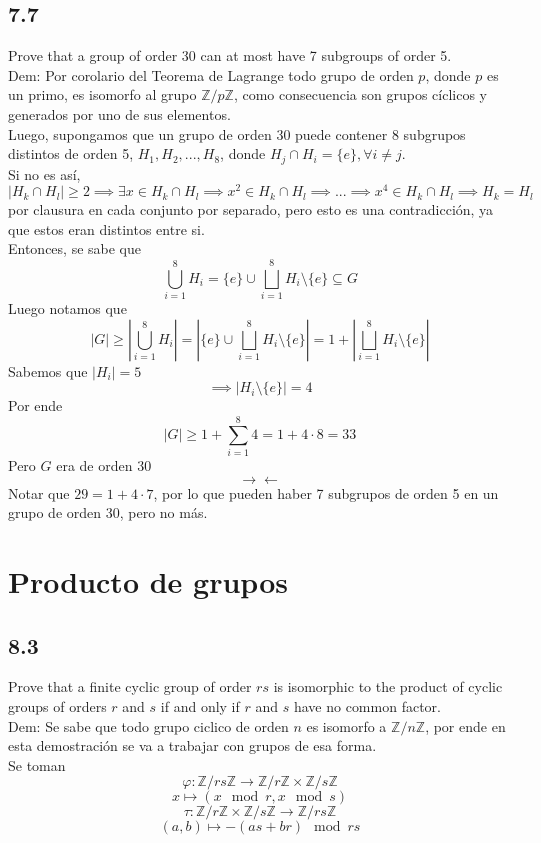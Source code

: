 \documentclass[11pt]{article}
\begin{document}
\subsection*{7.7}
Prove that a group of order 30 can at most have 7 subgroups of order 5.\\
Dem: Por corolario del Teorema de Lagrange todo grupo de orden $p$, donde $p$ es un primo, es isomorfo al grupo $\mathbb{Z}/p\mathbb{Z}$, como consecuencia son grupos cíclicos y generados por uno de sus elementos.\\
Luego, supongamos que un grupo de orden 30 puede contener 8 subgrupos distintos de orden 5, $H_1,H_2,...,H_8$, donde $H_j\cap H_i=\{e\},\forall i\neq j$.\\
Si no es así, $|H_k\cap H_l|\geq 2\implies \exists x\in H_k\cap H_l\implies x^2\in H_k\cap H_l\implies...\implies x^4\in H_k\cap H_l\implies H_k=H_l$ por clausura en cada conjunto por separado, pero esto es una contradicción, ya que estos eran distintos entre si.\\
Entonces, se sabe que
\[
\bigcup^8_{i=1}H_i=\{e\}\cup\bigsqcup^8_{i=1}H_i\setminus\{e\}\subseteq G
\]
Luego notamos que
\[
|G|\geq |\bigcup^8_{i=1}H_i|=|\{e\}\cup\bigsqcup^8_{i=1}H_i\setminus\{e\}|=1+|\bigsqcup^8_{i=1}H_i\setminus\{e\}|
\]
Sabemos que $|H_i|=5$
\[
\implies |H_i\setminus\{e\}|=4
\]
Por ende
\[
|G|\geq 1+\sum^8_{i=1}4=1+4\cdot 8=33
\]
Pero $G$ era de orden 30 
\[
\rightarrow\leftarrow
\]
Notar que $29=1+4\cdot 7$, por lo que pueden haber 7 subgrupos de orden 5 en un grupo de orden 30, pero no más.
\section{Producto de grupos}
\subsection*{8.3}
Prove that a finite cyclic group of order $rs$ is isomorphic to the product of cyclic groups of orders $r$ and $s$ if and only if $r$ and $s$ have no common factor.\\
Dem: Se sabe que todo grupo ciclico de orden $n$ es isomorfo a $\mathbb{Z}/n\mathbb{Z}$, por ende en esta demostración se va a trabajar con grupos de esa forma.\\
Se toman 
\[\varphi:\mathbb{Z}/rs\mathbb{Z}\rightarrow \mathbb{Z}/r\mathbb{Z}\times\mathbb{Z}/s\mathbb{Z}\]
\[x\mapsto(x \mod r,x\mod s)\]
\[\tau:\mathbb{Z}/r\mathbb{Z}\times\mathbb{Z}/s\mathbb{Z}\rightarrow\mathbb{Z}/rs\mathbb{Z}\]
\[(a,b)\mapsto -(as+br) \mod rs\]
\end{document}
